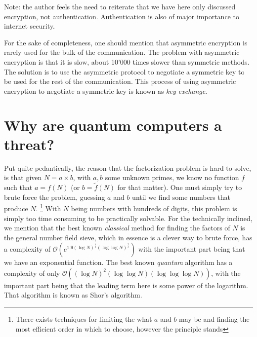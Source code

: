 \documentclass[conference]{IEEEtran}
\begin{document}
Note: the author feels the need to reiterate that we have here only discussed encryption, not authentication. Authentication is also of major importance to internet security.


For the sake of completeness, one should mention that asymmetric encryption is rarely used for the bulk of the communication.
The problem with asymmetric encryption is that it is slow, about 10'000 times slower than symmetric methods.
The solution is to use the asymmetric protocol to negotiate a symmetric key to be used for the rest of the communication.
This process of using asymmetric encryption to negotiate a symmetric key is known as \emph{key exchange}.


\section{Why are quantum computers a threat?}
Put quite pedantically, the reason that the factorization problem is hard to solve, is that given $N = a \times b$, with $a,b$ some unknown primes, we know no function $f$ such that $a = f(N)$ (or $b=\tilde{f}(N)$ for that matter).
One must simply try to brute force the problem, guessing $a$ and $b$ until we find some numbers that produce $N$. \footnote{There exists techniques for limiting the what $a$ and $b$ may be and finding the most efficient order in which to choose, however the principle stands}
With $N$ being numbers with hundreds of digits, this problem is simply too time consuming to be practically solvable.
For the technically inclined, we mention that the best known \emph{classical} method for finding the factors of $N$ is the general number field sieve, which in essence is a clever way to brute force, has a complexity of
$\mathcal{O}(e^{1.9 (\log N)^\frac13 (\log\log N)^\frac23})$ with the important part being that we have an exponential function.
The best known \emph{quantum} algorithm has a complexity of only $\mathcal{O}((\log N)^2 (\log \log N)(\log \log\log N))$, with the important part being that the leading term here is some power of the logarithm.
That algorithm is known as Shor's algorithm.
\end{document}
